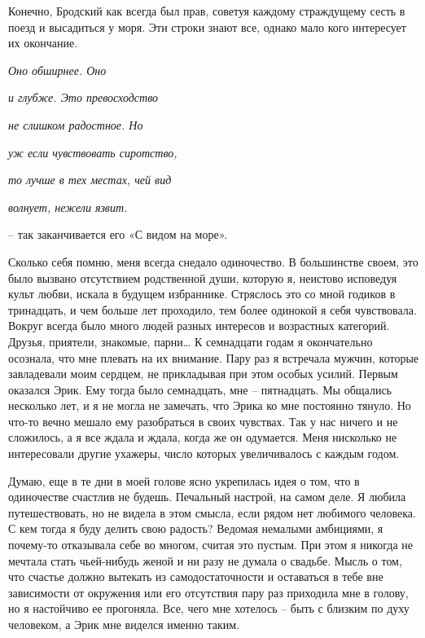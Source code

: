 \documentclass[
]{book}
\begin{document}
Конечно, Бродский как всегда был прав, советуя каждому страждущему сесть в поезд и высадиться у моря. Эти строки знают все, однако мало кого интересует их окончание.

\emph{Оно обширнее. Оно}

\emph{и глубже. Это превосходство}

\emph{не слишком радостное. Но}

\emph{уж если чувствовать сиротство, }

\emph{то лучше в тех местах, чей вид }

\emph{волнует, нежели язвит.}

-- так заканчивается его «С видом на море».

Сколько себя помню, меня всегда снедало одиночество. В большинстве своем, это было вызвано отсутствием родственной души, которую я, неистово исповедуя культ любви, искала в будущем избраннике. Стряслось это со мной годиков в тринадцать, и чем больше лет проходило, тем более одинокой я себя чувствовала. Вокруг всегда было много людей разных интересов и возрастных категорий. Друзья, приятели, знакомые, парни\ldots{} К семнадцати годам я окончательно осознала, что мне плевать на их внимание. Пару раз я встречала мужчин, которые завладевали моим сердцем, не прикладывая при этом особых усилий. Первым оказался Эрик. Ему тогда было семнадцать, мне -- пятнадцать. Мы общались несколько лет, и я не могла не замечать, что Эрика ко мне постоянно тянуло. Но что-то вечно мешало ему разобраться в своих чувствах. Так у нас ничего и не сложилось, а я все ждала и ждала, когда же он одумается. Меня нисколько не интересовали другие ухажеры, число которых увеличивалось с каждым годом.

Думаю, еще в те дни в моей голове ясно укрепилась идея о том, что в одиночестве счастлив не будешь. Печальный настрой, на самом деле. Я любила путешествовать, но не видела в этом смысла, если рядом нет любимого человека. С кем тогда я буду делить свою радость? Ведомая немалыми амбициями, я почему-то отказывала себе во многом, считая это пустым. При этом я никогда не мечтала стать чьей-нибудь женой и ни разу не думала о свадьбе. Мысль о том, что счастье должно вытекать из самодостаточности и оставаться в тебе вне зависимости от окружения или его отсутствия пару раз приходила мне в голову, но я настойчиво ее прогоняла. Все, чего мне хотелось -- быть с близким по духу человеком, а Эрик мне виделся именно таким.
\end{document}
